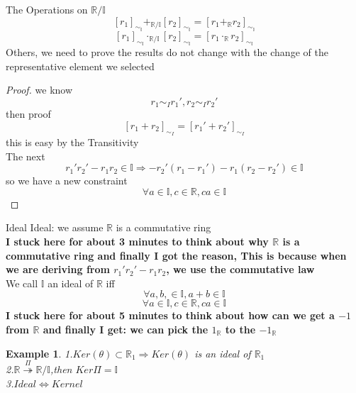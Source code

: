 \documentclass[13pt, a4paper, oneside]{book}
\newtheorem{example}{Example}[section]
\newenvironment{Proof}{\begin{proof}[Proof]}{\end{proof}}
\begin{document}
	\begin{definition}{The Operations on $\mathbb{R}/ \mathbb{I}$}{}
		$$ \left[ r_1 \right]_{\sim_{\mathbb{I}}} +_{\mathbb{R}/ \mathbb{I}} \left[ r_2 \right]_{\sim_{\mathbb{I}}} = \left[ r_1 +_{\mathbb{R}} r_2 \right]_{\sim_{\mathbb{I}}}$$
		$$ \left[ r_1 \right]_{\sim_{\mathbb{I}}} \cdot_{\mathbb{R}/ \mathbb{I}} \left[ r_2 \right]_{\sim_{\mathbb{I}}} = \left[ r_1 \cdot_{\mathbb{R}} r_2 \right]_{\sim_{\mathbb{I}}}$$
		Others, we need to prove the results do not change with the change of the representative element we selected
	\end{definition}
	
	\begin{Proof}
		we know$$ r_1 \sim_{I} r_1', r_2 \sim_{I} r_2' $$
		then proof$$ \left[r_1 +r_2\right]_{\sim_{I}} = \left[r_1' + r_2'\right]_{\sim_{I}} $$
		this is easy by the Transitivity \\
		The next $$ r_1'r_2' - r_1r_2 \in \mathbb{I} \Longrightarrow -r_2'(r_1 -r_1') -r_1(r_2-r_2') \in \mathbb{I}$$
		so we have a new constraint $$ \forall a \in \mathbb{I}, c \in \mathbb{R}, ca \in \mathbb{I} $$
	\end{Proof}
	
	\begin{definition}{Ideal}{}
		Ideal: we assume $\mathbb{R}$ is a commutative ring\\
		\textbf{I stuck here for about 3 minutes to think about why $\mathbb{R}$ is a commutative ring and finally I got the reason, This is because when we are deriving from $ r_1'r_2' - r_1r_2$, we use the commutative law} \\
		We call $ \mathbb{I} $ an ideal of $\mathbb{R}$ iff \\
		$$ \forall a,b,\in \mathbb{I}, a+b \in \mathbb{I} $$
		$$ \forall a \in \mathbb{I}, c \in \mathbb{R}, ca \in \mathbb{I} $$
		\textbf{I stuck here for about 5 minutes to think about how can we get a $-1$ from $\mathbb{R}$ and finally I get: we can pick the $1_{\mathbb{R}}$ to the $-1_{\mathbb{R}}$}
	\end{definition}
	
	\begin{example}
		1.$Ker(\theta) \subset \mathbb{R}_1 \Longrightarrow Ker(\theta)$ is an ideal of $\mathbb{R}_1$ \\
		2.$ \mathbb{R} \overset{\Pi}{\twoheadrightarrow} \mathbb{R}/ \mathbb{I} $,then $Ker\Pi = \mathbb{I}$ \\
		3.$Ideal \Longleftrightarrow Kernel$
	\end{example}
	
\end{document}
